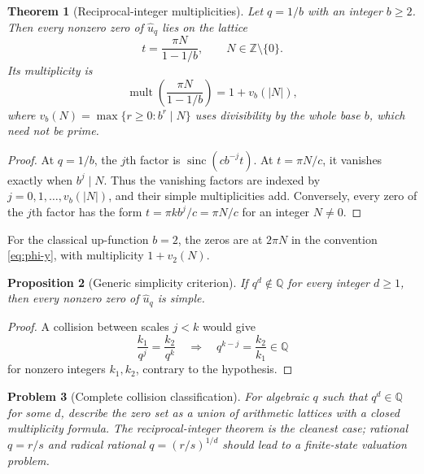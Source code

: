 \documentclass[11pt,oneside]{article}
\newtheorem{theorem}{Theorem}[section]
\newtheorem{proposition}[theorem]{Proposition}
\newtheorem{problem}[theorem]{Problem}
\theoremstyle{definition}
\theoremstyle{remark}
\newcommand{\Q}{\mathbb Q}
\newcommand{\Z}{\mathbb Z}
\newcommand{\sinc}{\operatorname{sinc}}
\begin{document}
\begin{theorem}[Reciprocal-integer multiplicities]
\label{thm:zero-multiplicity}
Let $q=1/b$ with an integer $b\ge2$.  Then every nonzero zero of $\widehat u_q$ lies on the
lattice
\begin{equation}
 t=\frac{\pi N}{1-1/b},\qquad N\in\Z\setminus\{0\}.          \label{eq:zero-lattice}
\end{equation}
Its multiplicity is
\begin{equation}
 \boxed{\displaystyle
 \operatorname{mult}\!\left(\frac{\pi N}{1-1/b}\right)
 =1+v_b(|N|),}                                               \label{eq:zero-mult}
\end{equation}
where
\(
 v_b(N)=\max\{r\ge0:b^r\mid N\}
\)
uses divisibility by the whole base $b$, which need not be prime.
\end{theorem}

\begin{proof}
At $q=1/b$, the $j$th factor is
$\sinc(cb^{-j}t)$.  At $t=\pi N/c$, it vanishes exactly when
$b^j\mid N$.  Thus the vanishing factors are indexed by
$j=0,1,\ldots,v_b(|N|)$, and their simple multiplicities add.  Conversely, every zero of the
$j$th factor has the form $t=\pi kb^j/c=\pi N/c$ for an integer $N\ne0$.
\end{proof}

For the classical up-function $b=2$, the zeros are at $2\pi N$ in the convention
\eqref{eq:phi-y}, with multiplicity $1+v_2(N)$.

\begin{proposition}[Generic simplicity criterion]
\label{prop:generic-zeros}
If $q^d\notin\Q$ for every integer $d\ge1$, then every nonzero zero of
$\widehat u_q$ is simple.
\end{proposition}

\begin{proof}
A collision between scales $j<k$ would give
\[
 \frac{k_1}{q^j}=\frac{k_2}{q^k}
 \quad\Longrightarrow\quad
 q^{k-j}=\frac{k_2}{k_1}\in\Q
\]
for nonzero integers $k_1,k_2$, contrary to the hypothesis.
\end{proof}

\begin{problem}[Complete collision classification]
For algebraic $q$ such that $q^d\in\Q$ for some $d$, describe the zero set as a union of
arithmetic lattices with a closed multiplicity formula.  The reciprocal-integer theorem is
the cleanest case; rational $q=r/s$ and radical rational $q=(r/s)^{1/d}$ should lead to a
finite-state valuation problem.
\end{problem}
\end{document}
